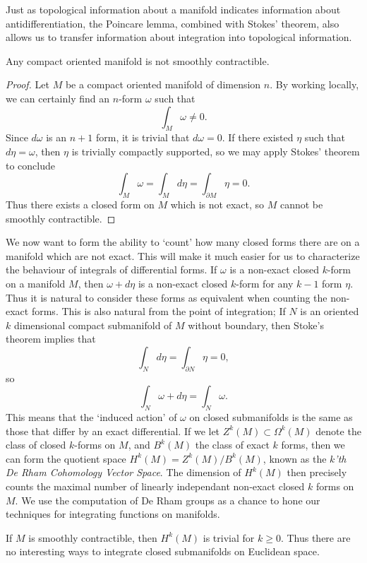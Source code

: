 Just as topological information about a manifold indicates information about antidifferentiation, the Poincare lemma, combined with Stokes' theorem, also allows us to transfer information about integration into topological information.

\begin{theorem}
    Any compact oriented manifold is not smoothly contractible.
\end{theorem}
\begin{proof}
    Let $M$ be a compact oriented manifold of dimension $n$. By working locally, we can certainly find an $n$-form $\omega$ such that
    \[ \int_M \omega \neq 0. \]
    Since $d\omega$ is an $n+1$ form, it is trivial that $d\omega = 0$. If there existed $\eta$ such that $d\eta = \omega$, then $\eta$ is trivially compactly supported, so we may apply Stokes' theorem to conclude
    \[ \int_M \omega = \int_M d\eta = \int_{\partial M} \eta = 0. \]
    Thus there exists a closed form on $M$ which is not exact, so $M$ cannot be smoothly contractible.
\end{proof}

We now want to form the ability to `count' how many closed forms there are on a manifold which are not exact. This will make it much easier for us to characterize the behaviour of integrals of differential forms. If $\omega$ is a non-exact closed $k$-form on a manifold $M$, then $\omega + d \eta$ is a non-exact closed $k$-form for any $k-1$ form $\eta$. Thus it is natural to consider these forms as equivalent when counting the non-exact forms. This is also natural from the point of integration; If $N$ is an oriented $k$ dimensional compact submanifold of $M$ without boundary, then Stoke's theorem implies that
%
\[ \int_N d\eta = \int_{\partial N} \eta = 0, \]
%
so
%
\[ \int_N \omega + d \eta = \int_N \omega. \]
%
This means that the `induced action' of $\omega$ on closed submanifolds is the same as those that differ by an exact differential. If we let $Z^k(M) \subset \Omega^k(M)$ denote the class of closed $k$-forms on $M$, and $B^k(M)$ the class of exact $k$ forms, then we can form the quotient space $H^k(M) = Z^k(M)/B^k(M)$, known as the \emph{$k$'th De Rham Cohomology Vector Space}. The dimension of $H^k(M)$ then precisely counts the maximal number of linearly independant non-exact closed $k$ forms on $M$. We use the computation of De Rham groups as a chance to hone our techniques for integrating functions on manifolds.

\begin{example}
    If $M$ is smoothly contractible, then $H^k(M)$ is trivial for $k \geq 0$. Thus there are no interesting ways to integrate closed submanifolds on Euclidean space.
\end{example}

